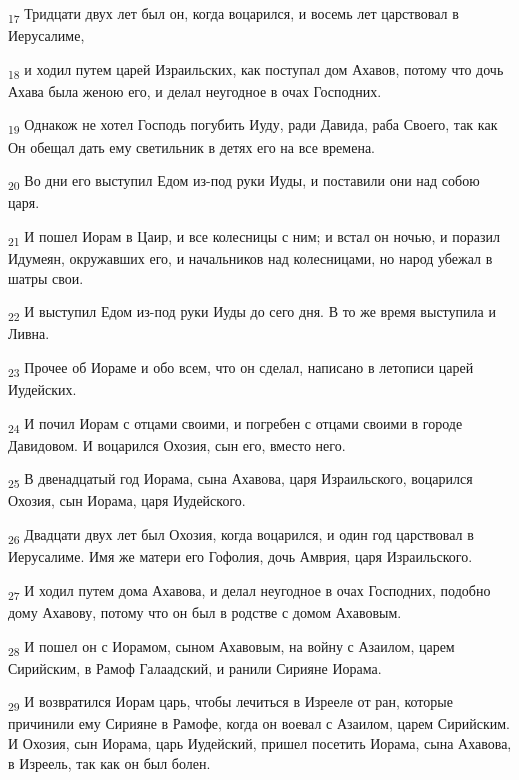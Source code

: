 \begin{tcolorbox}
\textsubscript{17} Тридцати двух лет был он, когда воцарился, и восемь лет царствовал в Иерусалиме,
\end{tcolorbox}
\begin{tcolorbox}
\textsubscript{18} и ходил путем царей Израильских, как поступал дом Ахавов, потому что дочь Ахава была женою его, и делал неугодное в очах Господних.
\end{tcolorbox}
\begin{tcolorbox}
\textsubscript{19} Однакож не хотел Господь погубить Иуду, ради Давида, раба Своего, так как Он обещал дать ему светильник в детях его на все времена.
\end{tcolorbox}
\begin{tcolorbox}
\textsubscript{20} Во дни его выступил Едом из-под руки Иуды, и поставили они над собою царя.
\end{tcolorbox}
\begin{tcolorbox}
\textsubscript{21} И пошел Иорам в Цаир, и все колесницы с ним; и встал он ночью, и поразил Идумеян, окружавших его, и начальников над колесницами, но народ убежал в шатры свои.
\end{tcolorbox}
\begin{tcolorbox}
\textsubscript{22} И выступил Едом из-под руки Иуды до сего дня. В то же время выступила и Ливна.
\end{tcolorbox}
\begin{tcolorbox}
\textsubscript{23} Прочее об Иораме и обо всем, что он сделал, написано в летописи царей Иудейских.
\end{tcolorbox}
\begin{tcolorbox}
\textsubscript{24} И почил Иорам с отцами своими, и погребен с отцами своими в городе Давидовом. И воцарился Охозия, сын его, вместо него.
\end{tcolorbox}
\begin{tcolorbox}
\textsubscript{25} В двенадцатый год Иорама, сына Ахавова, царя Израильского, воцарился Охозия, сын Иорама, царя Иудейского.
\end{tcolorbox}
\begin{tcolorbox}
\textsubscript{26} Двадцати двух лет был Охозия, когда воцарился, и один год царствовал в Иерусалиме. Имя же матери его Гофолия, дочь Амврия, царя Израильского.
\end{tcolorbox}
\begin{tcolorbox}
\textsubscript{27} И ходил путем дома Ахавова, и делал неугодное в очах Господних, подобно дому Ахавову, потому что он был в родстве с домом Ахавовым.
\end{tcolorbox}
\begin{tcolorbox}
\textsubscript{28} И пошел он с Иорамом, сыном Ахавовым, на войну с Азаилом, царем Сирийским, в Рамоф Галаадский, и ранили Сирияне Иорама.
\end{tcolorbox}
\begin{tcolorbox}
\textsubscript{29} И возвратился Иорам царь, чтобы лечиться в Изрееле от ран, которые причинили ему Сирияне в Рамофе, когда он воевал с Азаилом, царем Сирийским. И Охозия, сын Иорама, царь Иудейский, пришел посетить Иорама, сына Ахавова, в Изреель, так как он был болен.
\end{tcolorbox}
